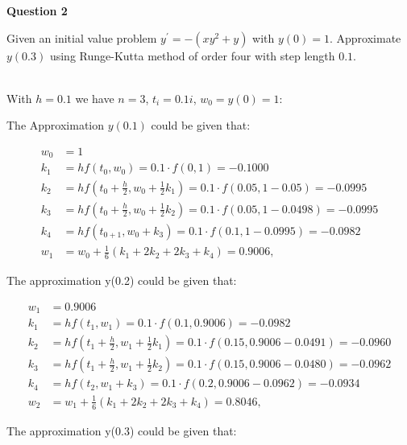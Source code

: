 

\begin{tcolorbox}
\textbf{Question 2} 


Given an initial value problem $y^{\prime}=-\left(x y^{2}+y\right)$ with $y(0)=1$. Approximate $y(0.3)$ using Runge-Kutta method of order four with step length $0.1$.




\end{tcolorbox}

\begin{solution}\ \\
With $h=0.1$ we have $n=3$, $t_i=0.1 i$, $w_0=y(0)=1$:


The Approximation $y(0.1)$ could be given that:

$$
\begin{aligned}
w_{0} &=1 \\
k_{1} &=h f\left(t_{0}, w_{0}\right)=0.1 \cdot f(0,1)=-0.1000 \\
k_{2} &=h f\left(t_{0}+\frac{h}{2}, w_{0}+\frac{1}{2} k_{1}\right)
=0.1 \cdot f(0.05,1-0.05) =-0.0995 \\
k_{3} &=h f\left(t_{0}+\frac{h}{2}, w_{0}+\frac{1}{2} k_{2}\right) =0.1 \cdot f(0.05,1-0.0498)=-0.0995\\
k_{4} &=h f\left(t_{0+1}, w_{0}+k_{3}\right)=0.1 \cdot f(0.1,1-0.0995)=-0.0982  \\
w_{1} &=w_{0}+\frac{1}{6}\left(k_{1}+2 k_{2}+2 k_{3}+k_{4}\right)=0.9006,
\end{aligned}
$$ 

The approximation y(0.2) could be given that:

$$
\begin{aligned}
w_{1} &=0.9006 \\
k_{1} &=h f\left(t_{1}, w_{1}\right)=0.1 \cdot f(0.1,0.9006)=-0.0982 \\
k_{2} &=h f\left(t_{1}+\frac{h}{2}, w_{1}+\frac{1}{2} k_{1}\right)
=0.1 \cdot f(0.15,0.9006-0.0491) =-0.0960 \\
k_{3} &=h f\left(t_{1}+\frac{h}{2}, w_{1}+\frac{1}{2} k_{2}\right) =0.1 \cdot f(0.15,0.9006-0.0480)=-0.0962\\
k_{4} &=h f\left(t_{2}, w_{1}+k_{3}\right)=0.1 \cdot f(0.2,0.9006-0.0962)=-0.0934  \\
w_{2} &=w_{1}+\frac{1}{6}\left(k_{1}+2 k_{2}+2 k_{3}+k_{4}\right)=0.8046,
\end{aligned}
$$ 


The approximation y(0.3) could be given that:


\end{solution}
